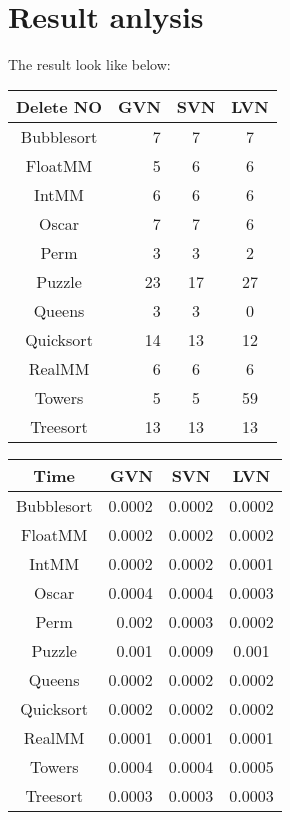 \


\section{Result anlysis}
The result look like below:
\begin{center}
\begin{tabular}{|c|r|c|c|}
\hline
Delete NO & GVN  & SVN  & LVN \\
\hline
Bubblesort & 7 & 7 & 7  \\
\hline
FloatMM & 5 & 6 & 6  \\
\hline
IntMM & 6 & 6 &6 \\
\hline
Oscar & 7 & 7 & 6 \\
\hline
Perm & 3 & 3 & 2 \\
\hline
Puzzle & 23 & 17 & 27 \\
\hline
Queens & 3 & 3 & 0 \\
\hline
Quicksort & 14 & 13 & 12\\
\hline
RealMM & 6 & 6 & 6 \\
\hline
Towers & 5 & 5 & 59  \\
\hline
Treesort & 13 & 13 & 13\\
\hline
\end{tabular}
\end{center}
\begin{center}
\begin{tabular}{|c|r|c|c|}
\hline
Time & GVN  & SVN  & LVN\\ 
\hline
Bubblesort & 0.0002 & 0.0002 & 0.0002  \\
\hline
FloatMM & 0.0002  & 0.0002 & 0.0002  \\
\hline
IntMM & 0.0002 & 0.0002 & 0.0001 \\
\hline
Oscar & 0.0004 & 0.0004 & 0.0003 \\
\hline
Perm & 0.002 & 0.0003 & 0.0002 \\
\hline
Puzzle & 0.001 & 0.0009 & 0.001\\
\hline
Queens & 0.0002 & 0.0002 & 0.0002  \\
\hline
Quicksort & 0.0002 & 0.0002 & 0.0002\\
\hline
RealMM & 0.0001 & 0.0001 &  0.0001\\
\hline
Towers & 0.0004 & 0.0004 & 0.0005  \\
\hline
Treesort & 0.0003 & 0.0003 & 0.0003\\
\hline
\end{tabular}
\end{center}
